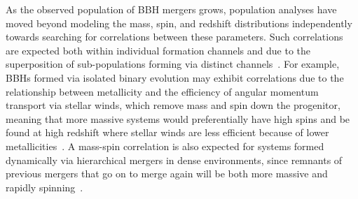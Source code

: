 \documentclass[%
 reprint,
 amsmath,amssymb,
 aps,
 prd,
]{revtex4-2}
\begin{document}
As the observed population of \ac{BBH} mergers grows, population analyses have moved beyond modeling the mass, spin, and redshift distributions independently towards searching for correlations between these parameters.
Such correlations are expected both within individual formation channels and due to the superposition of sub-populations forming via distinct channels~\cite{Bavera:2022mef, Bavera:2020inc,McKernan:2012rf, Stone:2016wzz, McKernan:2019beu, McKernan:2021nwk, Tagawa:2019osr,Zevin:2022wrw}. For example, \acp{BBH} formed via isolated binary evolution may exhibit correlations due to the relationship between metallicity and the efficiency of angular momentum transport via stellar winds, which remove mass and spin down the progenitor, meaning that more massive systems would preferentially have high spins and be found at high redshift where stellar winds are less efficient because of lower metallicities~\cite{Belczynski:2017gds}.
A mass-spin correlation is also expected for systems formed dynamically via hierarchical mergers in dense environments, since remnants of previous mergers that go on to merge again will be both more massive and rapidly spinning~\cite[e.g.,][]{PortegiesZwart:2002iks, Rodriguez:2015oxa, Gerosa:2021mno}. 
\end{document}
